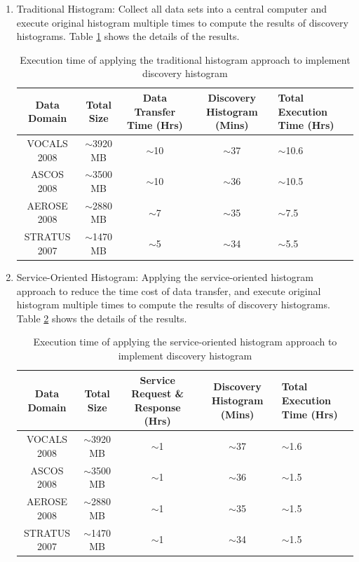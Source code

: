 \documentclass[times, 10pt,onecolumn]{article} %
\begin{document}
\begin{enumerate}
\item{Traditional Histogram:} Collect all data sets into a central computer and execute original histogram multiple times to compute the results of discovery histograms. Table \ref{tbl:1stStr} shows the details of the results.

\begin{table}[!iht]
\centering
\begin{tabular}{|c|c|c|c|p{3cm}|}
\hline
\textbf{Data Domain} & \textbf{Total Size} & \textbf{ Data Transfer Time (Hrs)} & \textbf{Discovery Histogram (Mins)} & \textbf{Total Execution Time (Hrs)}  \\ \hline
VOCALS 2008 &  $\sim$3920 MB & $\sim$10 & $\sim$37& $\sim$10.6\\ \hline
ASCOS 2008 & $\sim$3500 MB & $\sim$10 & $\sim$36& $\sim$10.5\\ \hline 
AEROSE 2008 & $\sim$2880 MB & $\sim$7 & $\sim$35&  $\sim$7.5 \\\hline 
STRATUS 2007 & $\sim$1470 MB & $\sim$5  & $\sim$34&  $\sim$5.5\\\hline
\end{tabular}
\caption{ Execution time of applying the traditional histogram approach to implement discovery histogram }
\label{tbl:1stStr}
\end{table}

\item{Service-Oriented Histogram:} Applying the service-oriented histogram approach to reduce the time cost of data transfer, and execute original histogram multiple times to compute the results of discovery histograms. Table \ref{tbl:2ndStr} shows the details of the results.

\begin{table}[!iht]
\centering
\begin{tabular}{|c|c|c|c|p{3cm}|}
\hline
\textbf{Data Domain} & \textbf{Total Size} & \textbf{ Service Request \& Response (Hrs)} & \textbf{Discovery Histogram (Mins) }& \textbf{Total Execution Time (Hrs) } \\ \hline
VOCALS 2008 &  $\sim$3920 MB & $\sim$1 & $\sim$37& $\sim$1.6\\ \hline
ASCOS 2008 & $\sim$3500 MB & $\sim$1 & $\sim$36& $\sim$1.5\\ \hline 
AEROSE 2008 & $\sim$2880 MB & $\sim$1 & $\sim$35&  $\sim$1.5 \\\hline 
STRATUS 2007 & $\sim$1470 MB & $\sim$1  & $\sim$34&  $\sim$1.5\\\hline
\end{tabular}
\caption{ Execution time of applying the service-oriented histogram approach to implement discovery histogram}
\label{tbl:2ndStr}
\end{table}


\end{enumerate}
\end{document}
